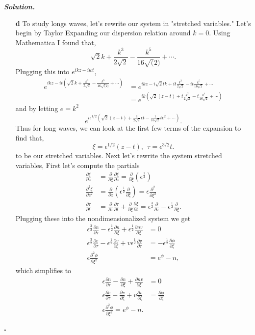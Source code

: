 \documentclass[12pt]{report}
\newenvironment{solution}[1][\it{Solution}]{\textbf{#1. } }{$\square$}
\def\eps{{\epsilon}}
\newcommand{\paren}[1]{{\left(#1\right)}} %
\newcommand{\pp}[2]{\frac{\partial #1}{\partial #2}} %
\newcommand{\ppn}[3]{\frac{\partial^{#1} #2}{\partial #3^{#1}}} %
\begin{document}
\begin{solution}
\begin{enumerate}
    \item[{\bf d}] To study longs waves, let's rewrite our system in "stretched variables." Let's begin by Taylor Expanding our dispersion relation around $k = 0$. Using Mathematica I found that,
    \[ 
        \sqrt{2} k + \frac{k^3}{2 \sqrt{2}} - \frac{k^5}{16 \sqrt(2)} + \cdots.
    \]
    Plugging this into $e^{ikz - iwt}$,
    \begin{align*}
        e^{ikz - it\paren{\sqrt{2} k + \frac{k^3}{2 \sqrt{2}} - \frac{k^5}{16 \sqrt(2)} + \cdots}} &= e^{ikz - i\sqrt{2}tk+it\frac{k^3}{2\sqrt{2}} - it\frac{k^5}{16\sqrt{2}} + \cdots}\\
        &= e^{ik\left( \sqrt{2}(z - t)+t\frac{k^2}{2\sqrt{2}} - t\frac{k^4}{16\sqrt{2}} + \cdots \right)}
    \end{align*}
    and by letting $e = k^2$ 
    \[ e^{i\eps^{1/2} \paren{\sqrt{2}(z - t) + \frac{1}{2\sqrt{2}} \eps t - \frac{1}{16\sqrt{2}}t\eps^2 + \cdots}}.\] 
    Thus for long waves, we can look at the first few terms of the expansion to find that,
    \[ 
        \xi=\eps^{1/2}(z-t), ~~\tau=\eps^{3/2} t.
    \]
    to be our stretched variables. 
    Next let's rewrite the system stretched variables, First let's compute the partials
    \begin{align*}
        \pp{\xi}{z} &= \pp{}{\xi} \pp{\xi}{z} = \pp{}{\xi}(\eps^{\frac{1}{2}})\\
        \ppn{2}{\xi}{z} &=\pp{}{z}\left( \eps^{\frac{1}{2}} \pp{}{\xi}\right) = \eps \ppn{2}{}{\xi}\\
        \pp{\tau}{t} &= \pp{}{\tau}\pp{\tau}{t} + \pp{}{\xi}\pp{\xi}{t} = \eps^{\frac{3}{2}} \pp{}{\tau} - \eps^{\frac{1}{2}}\pp{}{\xi}.
    \end{align*}
    Plugging these into the nondimensionalized system we get
    \begin{align*}
        \eps^{\frac{3}{2}} \pp{n}{\tau} - \eps^{\frac{1}{2}} \pp{n}{\xi} + \eps^{\frac{1}{2}} \pp{nv}{\xi} &= 0\\
        \eps^{\frac{3}{2}} \pp{v}{\tau} - \eps^{\frac{1}{2}} \pp{v}{\xi} + v\eps^{\frac{1}{2}} \pp{v}{\tau} &= -\eps^{\frac{1}{2}} \pp{\phi}{\xi}\\
        \eps \ppn{2}{\phi}{\xi} &= e^\phi - n,
    \end{align*}
    which simplifies to
    \begin{align*}
        \eps \pp{n}{\tau} - \pp{n}{\xi} + \pp{nv}{\xi} &= 0\\
        \eps \pp{v}{\tau} - \pp{v}{\xi} + v \pp{v}{\xi} &= \pp{\phi}{\xi}\\
        \eps \ppn{2}{\phi}{\xi} = e^\phi - n.
    \end{align*}
    

\end{enumerate}
\end{solution}
\end{document}
